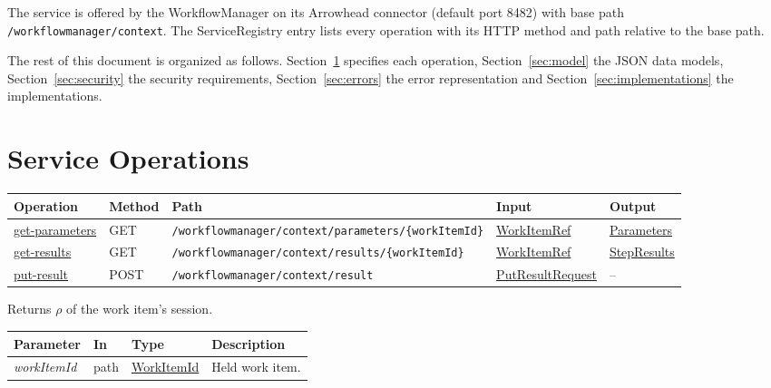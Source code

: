 \documentclass[a4paper]{arrowhead}
\newcommand{\fparam}[1]{\textit{\textcolor{ArrowheadBlue}{#1}}}
\newcommand{\mref}[1]{{\textcolor{ArrowheadPurple}{\hyperref[sec:model:#1]{#1}}}}
\newcommand{\oref}[1]{{\textcolor{ArrowheadBlue}{\hyperref[sec:operations:#1]{#1}}}}
\newcommand{\pref}[1]{{\textcolor{ArrowheadGrey}{\hyperref[sec:model:primitives:#1]{#1}}}}
\begin{document}
The service is offered by the WorkflowManager on its Arrowhead connector (default port 8482) with base path \texttt{/\allowbreak{}workflowmanager/\allowbreak{}context}.
The ServiceRegistry entry lists every operation with its HTTP method and path relative to the base path.

The rest of this document is organized as follows. Section~\ref{sec:operations} specifies each operation,
Section~\ref{sec:model} the JSON data models, Section~\ref{sec:security} the security requirements,
Section~\ref{sec:errors} the error representation and Section~\ref{sec:implementations} the implementations.

\newpage
\section{Service Operations}
\label{sec:operations}

{\small
\begin{longtable}{|p{3.0cm}|p{1.5cm}|p{5.3cm}|p{3.0cm}|p{3.0cm}|}

\hline
\rowcolor{gray!33} Operation & Method & Path & Input & Output \\ \hline
\endhead
\oref{get-parameters} & GET & \texttt{/\allowbreak{}workflowmanager/\allowbreak{}context/\allowbreak{}parameters/\allowbreak{}\{workItemId\}} & \mref{WorkItemRef} & \mref{Parameters} \\ \hline
\oref{get-results} & GET & \texttt{/\allowbreak{}workflowmanager/\allowbreak{}context/\allowbreak{}results/\allowbreak{}\{workItemId\}} & \mref{WorkItemRef} & \mref{StepResults} \\ \hline
\oref{put-result} & POST & \texttt{/\allowbreak{}workflowmanager/\allowbreak{}context/\allowbreak{}result} & \mref{PutResultRequest} & -- \\ \hline
\end{longtable}
}

Returns $\rho$ of the work item's session.

{\small
\begin{longtable}{|p{3.0cm}|p{1.4cm}|p{3.2cm}|p{8.2cm}|}

\hline
\rowcolor{gray!33} Parameter & In & Type & Description \\ \hline
\endhead
\fparam{workItemId} & path & \pref{WorkItemId} & Held work item. \\ \hline
\end{longtable}
}
\end{document}
